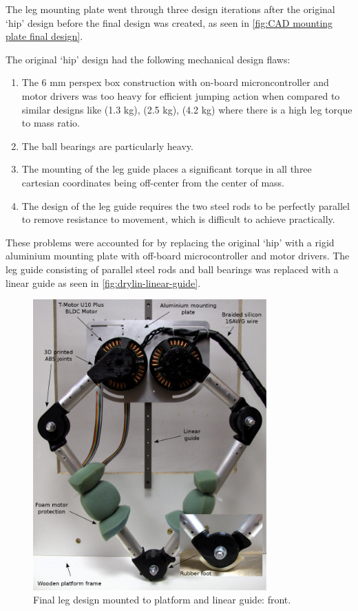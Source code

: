 The leg mounting plate went through three design iterations after the original `hip' design before the final design was created, as seen in \cref{fig:CAD mounting plate final design}.

The original `hip' design had the following mechanical design flaws:

\begin{enumerate}
\item The 6 mm perspex box construction with on-board microncontroller and motor drivers was too heavy for efficient jumping action when compared to similar designs like \cite{Duperret} (1.3 kg), \cite{Kalouche2016} (2.5 kg), \cite{Wang2012} (4.2 kg) where there is a high leg torque to mass ratio.
\item The ball bearings are particularly heavy.
\item The mounting of the leg guide places a significant torque in all three cartesian coordinates being off-center from the center of mass.
\item The design of the leg guide requires the two steel rods to be perfectly parallel to remove resistance to movement, which is difficult to achieve practically.
\end{enumerate}

These problems were accounted for by replacing the original `hip' with a rigid aluminium mounting plate with off-board microcontroller and motor drivers. The leg guide consisting of parallel steel rods and ball bearings was replaced with a linear guide as seen in \cref{fig:drylin-linear-guide}.  

\begin{figure}
\centering
\includegraphics[width=0.8\textwidth]{images/mechanical/leg-mount-annotated} 
\caption{Final leg design mounted to platform and linear guide: front.}
\label{fig:Final leg design - front}
\end{figure}

